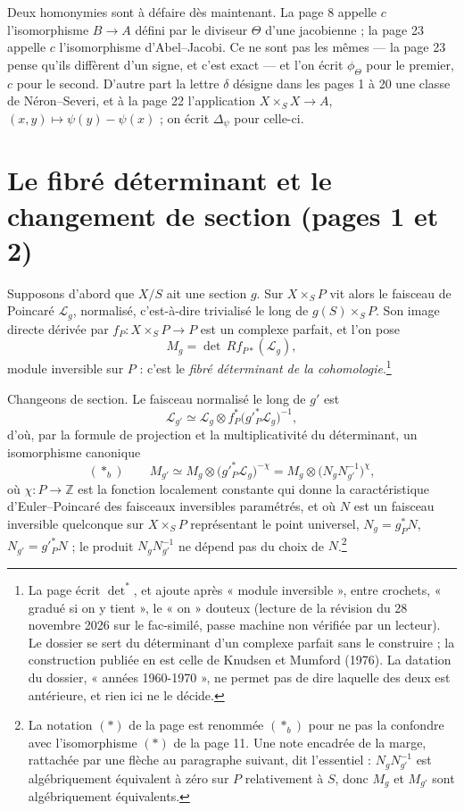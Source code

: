 \documentclass[11pt,a4paper]{article}
\begin{document}
Deux homonymies sont à défaire dès maintenant. La page 8 appelle $c$
l'isomorphisme $B \to A$ défini par le diviseur $\Theta$ d'une jacobienne ; la
page 23 appelle $c$ l'isomorphisme d'Abel--Jacobi. Ce ne sont pas les mêmes —
la page 23 pense qu'ils diffèrent d'un signe, et c'est exact — et l'on écrit
$\phi_{\Theta}$ pour le premier, $c$ pour le second. D'autre part la lettre
$\delta$ désigne dans les pages 1 à 20 une classe de Néron--Severi, et à la
page 22 l'application $X \times_S X \to A$, $(x, y) \mapsto \psi(y) -
\psi(x)$ ; on écrit $\Delta_{\psi}$ pour celle-ci.

\section*{Le fibré déterminant et le changement de section (pages 1 et 2)}

Supposons d'abord que $X/S$ ait une section $g$. Sur $X \times_S P$ vit alors
le faisceau de Poincaré $\mathcal{L}_g$, normalisé, c'est-à-dire trivialisé le
long de $g(S) \times_S P$. Son image directe dérivée par
$f_P : X \times_S P \to P$ est un complexe parfait, et l'on pose
\[
M_g = \det\, R f_{P*}(\mathcal{L}_g),
\]
module inversible sur $P$ : c'est le \emph{fibré déterminant de la
cohomologie}.\footnote{La page écrit ${\det}^{*}$, et ajoute après
« module inversible », entre crochets, « gradué si on y tient », le « on »
douteux (lecture de la révision du 28 novembre 2026 sur le fac-similé, passe
machine non vérifiée par un lecteur). Le dossier se sert du déterminant d'un complexe parfait sans le
construire ; la construction publiée en est celle de Knudsen et Mumford (1976).
La datation du dossier, « années 1960-1970 », ne permet pas de dire laquelle
des deux est antérieure, et rien ici ne le décide.}

Changeons de section. Le faisceau normalisé le long de $g'$ est
\[
\mathcal{L}_{g'} \simeq \mathcal{L}_g \otimes f_P^{*}\bigl(g'^{*}_P \mathcal{L}_g\bigr)^{-1},
\]
d'où, par la formule de projection et la multiplicativité du déterminant, un
isomorphisme canonique
\[
(*_{b}) \qquad M_{g'} \simeq M_g \otimes \bigl(g'^{*}_P \mathcal{L}_g\bigr)^{-\chi}
= M_g \otimes \bigl(N_g N_{g'}^{-1}\bigr)^{\chi},
\]
où $\chi : P \to \mathbb{Z}$ est la fonction localement constante qui donne la
caractéristique d'Euler--Poincaré des faisceaux inversibles paramétrés, et où
$N$ est un faisceau inversible quelconque sur $X \times_S P$ représentant le
point universel, $N_g = g_P^{*}N$, $N_{g'} = g'^{*}_P N$ ; le produit
$N_g N_{g'}^{-1}$ ne dépend pas du choix de $N$.\footnote{La notation $(*)$ de
la page est renommée $(*_{b})$ pour ne pas la confondre avec l'isomorphisme
$(*)$ de la page 11. Une note encadrée de la marge, rattachée par une flèche au
paragraphe suivant, dit l'essentiel : $N_g N_{g'}^{-1}$ est algébriquement
équivalent à zéro sur $P$ relativement à $S$, donc $M_g$ et $M_{g'}$ sont
algébriquement équivalents.}
\end{document}

